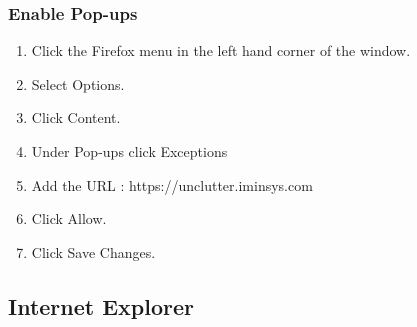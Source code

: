 \documentclass[hidelinks,english]{article}
\begin{document}
            \subsubsection{Enable Pop-ups}
            \begin{enumerate}
                \item Click the Firefox menu in the left hand corner of the window.
                \item Select Options.
                \item Click Content.
                \item Under Pop-ups click Exceptions
                \item Add the URL : https://unclutter.iminsys.com
                \item Click Allow.
                \item Click Save Changes.
            \end{enumerate}
           \begin{center}
            \end{center}
     
        \newpage
        \subsection{Internet Explorer}
\end{document}
